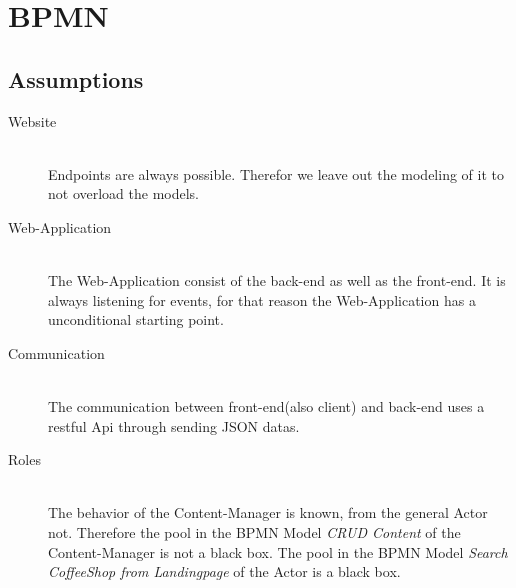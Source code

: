 \newpage
\section{BPMN}

\subsection{Assumptions}
\begin{description}
\item[Website]\hfill \\
Endpoints are always possible. Therefor we leave out the modeling of it to not overload the models.
\item[Web-Application]\hfill \\ 
The Web-Application consist of the back-end as well as the front-end.
It is always listening for events, for that reason the Web-Application has a unconditional starting point.
\item[Communication]\hfill \\ The communication between front-end(also client) and back-end uses a restful Api through sending JSON datas. 
\item[Roles]\hfill \\ 
The behavior of the Content-Manager is known, from the general Actor not.
Therefore the pool in the BPMN Model \textit{CRUD Content} of the Content-Manager is not a black box. The pool in the BPMN Model \textit{Search  CoffeeShop from Landingpage} of the Actor is a black box.
\end{description}


\newpage
